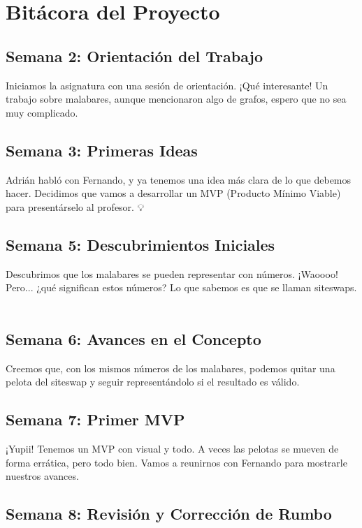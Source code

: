 \documentclass{article}
\begin{document}
\section*{Bitácora del Proyecto}

\subsection*{Semana 2: Orientación del Trabajo}

Iniciamos la asignatura con una sesión de orientación. ¡Qué interesante! Un trabajo sobre malabares, aunque mencionaron algo de grafos, espero que no sea muy complicado. 🤹‍♂️

\subsection*{Semana 3: Primeras Ideas}

Adrián habló con Fernando, y ya tenemos una idea más clara de lo que debemos hacer. Decidimos que vamos a desarrollar un MVP (Producto Mínimo Viable) para presentárselo al profesor. 💡

\subsection*{Semana 5: Descubrimientos Iniciales}

Descubrimos que los malabares se pueden representar con números. ¡Waoooo! Pero... ¿qué significan estos números? Lo que sabemos es que se llaman siteswaps. 🔢

\subsection*{Semana 6: Avances en el Concepto}

Creemos que, con los mismos números de los malabares, podemos quitar una pelota del siteswap y seguir representándolo si el resultado es válido. 🤔

\subsection*{Semana 7: Primer MVP}

¡Yupii! Tenemos un MVP con visual y todo. A veces las pelotas se mueven de forma errática, pero todo bien. Vamos a reunirnos con Fernando para mostrarle nuestros avances. 🎉

\subsection*{Semana 8: Revisión y Corrección de Rumbo}
\end{document}

